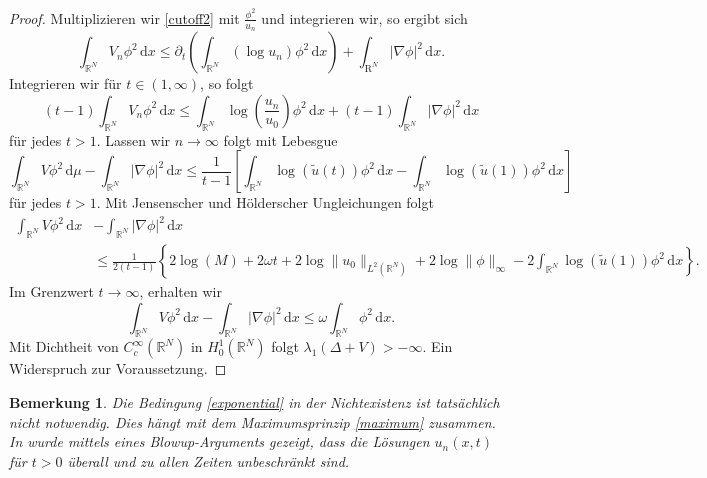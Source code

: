 \documentclass[11pt,twoside,a4paper]{article}
\theoremstyle{break}
\newtheorem{nt}[thm]{Bemerkung}
\begin{document}
\begin{proof}
Multiplizieren wir \eqref{cutoff2} mit $\frac{\phi^2}{u_n}$ und integrieren wir, so ergibt sich
\begin{equation}
\int_{\mathbb R^N} V_n \phi^2\, \mathrm dx \le \partial_t \left ( \int_{\mathbb R^N} (\log u_n) \phi^2\, \mathrm dx \right )+ \int_{\mathrm R^N} |\nabla \phi|^2\, \mathrm dx.
\end{equation}
Integrieren wir f\"ur $t\in (1,\infty)$, so folgt
\begin{equation}
(t-1) \int_{\mathbb R^N} V_n \phi^2\, \mathrm dx \le \int_{\mathbb R^N} \log \left ( \frac{u_n}{u_0} \right )\phi^2\, \mathrm dx + (t-1) \int_{\mathbb R^N}|\nabla \phi|^2\, \mathrm dx
\end{equation}
für jedes $t>1$. Lassen wir $n\to \infty$ folgt mit Lebesgue
\begin{equation}
\int_{\mathbb R^N} V\phi^2 \, \mathrm d\mu - \int_{\mathbb R^N} |\nabla \phi|^2 \, \mathrm dx \le \frac{1}{t-1} \left [ \int_{\mathbb R^N} \log(\tilde u(t)) \phi^2 \, \mathrm dx -\int_{\mathbb R^N} \log(\tilde u(1))\phi^2\, \mathrm dx \right ]
\end{equation}
für jedes $t>1$. Mit Jensenscher und Hölderscher Ungleichungen folgt
\begin{align*}
\int_{\mathbb R^N} V\phi^2 \, \mathrm dx &- \int_{\mathbb R^N} |\nabla \phi|^2\, \mathrm dx \\
 &\le  \frac{1}{2(t-1)} \left \{ 2\log(M) + 2\omega t + 2\log\|u_0\|_{L^2(\mathbb R^N)} + 2 \log \|\phi\|_\infty - 2\int_{\mathbb R^N} \log(\tilde u(1))\phi^2\, \mathrm dx \right \}.
\end{align*}
Im Grenzwert $t\to \infty$, erhalten wir
\begin{equation}
\int_{\mathbb R^N} V\phi^2\, \mathrm dx - \int_{\mathbb R^N} |\nabla \phi|^2\, \mathrm dx \le \omega \int_{\mathbb R^N} \phi^2\, \mathrm dx.
\end{equation}
Mit Dichtheit von $C_c^\infty(\mathbb R^N)$ in $H_0^1(\mathbb R^N)$ folgt $\lambda_1(\Delta +V) >-\infty$. Ein Widerspruch zur Voraussetzung.
\end{proof}
\begin{nt}\label{bem}
Die Bedingung \eqref{exponential} in der Nichtexistenz ist tatsächlich nicht notwendig. Dies hängt mit dem Maximumsprinzip \eqref{maximum} zusammen. In \cite{baras-goldstein} wurde mittels eines Blowup-Arguments gezeigt, dass die Lösungen $u_n(x,t)$ für $t>0$ überall und zu allen Zeiten unbeschränkt sind.
\end{nt}
\end{document}
